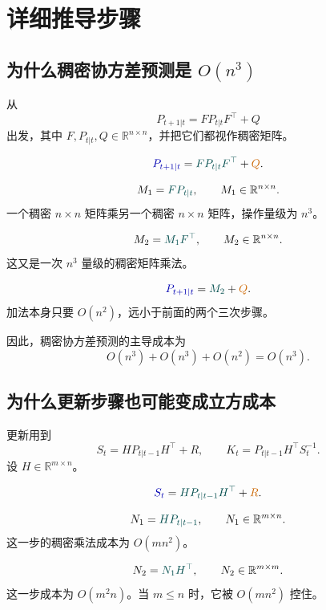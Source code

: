 \documentclass[12pt,a4paper]{ctexart}
\begin{document}
\section{详细推导步骤}\label{app:derivation-steps}

\subsection{为什么稠密协方差预测是 \(O(n^3)\)}\label{app:derivation-cost}

从
\[
P_{t+1|t} = F P_{t|t} F^\top + Q
\]
出发，其中 \(F, P_{t|t}, Q \in \mathbb{R}^{n \times n}\)，并把它们都视作稠密矩阵。

\[
\eqfocusa{P_{t+1|t}} = \eqfocusb{F P_{t|t} F^\top} + \eqfocusc{Q}.
\]

\[
M_1 = \eqfocusb{F P_{t|t}}, \qquad M_1 \in \mathbb{R}^{n \times n}.
\]
一个稠密 \(n \times n\) 矩阵乘另一个稠密 \(n \times n\) 矩阵，操作量级为 \(n^3\)。

\[
M_2 = \eqfocusb{M_1 F^\top}, \qquad M_2 \in \mathbb{R}^{n \times n}.
\]
这又是一次 \(n^3\) 量级的稠密矩阵乘法。

\[
\eqfocusa{P_{t+1|t}} = \eqfocusb{M_2} + \eqfocusc{Q}.
\]
加法本身只要 \(O(n^2)\)，远小于前面的两个三次步骤。

因此，稠密协方差预测的主导成本为
\[
O(n^3) + O(n^3) + O(n^2) = O(n^3).
\]

\subsection{为什么更新步骤也可能变成立方成本}\label{app:derivation-update}

更新用到
\[
S_t = H P_{t|t-1} H^\top + R,
\qquad
K_t = P_{t|t-1} H^\top S_t^{-1}.
\]
设 \(H \in \mathbb{R}^{m \times n}\)。

\[
\eqfocusa{S_t} = \eqfocusb{H P_{t|t-1} H^\top} + \eqfocusc{R}.
\]

\[
N_1 = \eqfocusb{H P_{t|t-1}}, \qquad N_1 \in \mathbb{R}^{m \times n}.
\]
这一步的稠密乘法成本为 \(O(m n^2)\)。

\[
N_2 = \eqfocusb{N_1 H^\top}, \qquad N_2 \in \mathbb{R}^{m \times m}.
\]
这一步成本为 \(O(m^2 n)\)。当 \(m \le n\) 时，它被 \(O(m n^2)\) 控住。
\end{document}

